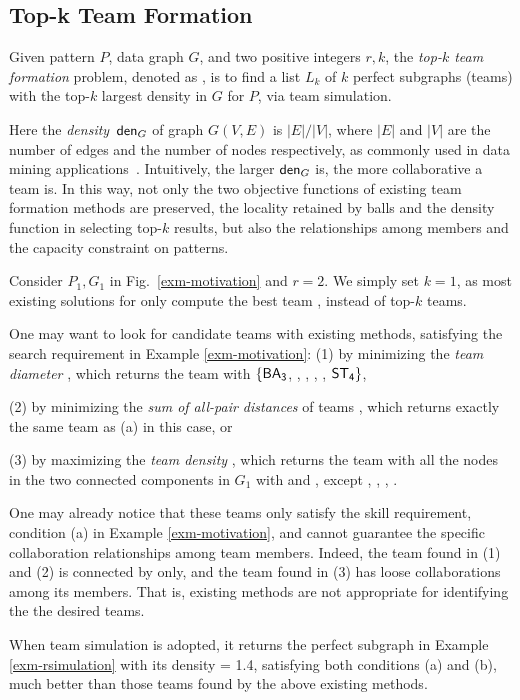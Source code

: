 
\subsection{Top-k Team Formation}
\label{subsec-teamF}

 Given pattern $P$, data graph $G$, and two positive integers $r, k$, the {\em top-$k$ team formation} problem, denoted as ,
is to find a list $L_{k}$ of $k$ perfect subgraphs (\ie teams) with the top-$k$ largest density in $G$ for $P$, via team simulation.

Here the {\em density}\, ${\mathsf{den}}_{G}$ of graph $G(V, E)$ is $|E|/|V|$, where $|E|$ and $|V|$ are the number of edges and the number of nodes respectively, as commonly used in data mining applications~\cite{maximumDenseSubgraph,EVMK12}.
Intuitively, the larger ${\mathsf{den}}_{G}$ is, the more collaborative a team is.
In this way, not only the two objective functions of existing team formation methods are preserved,
\ie the locality retained by balls and the density function in selecting top-$k$ results,
but also the relationships among members and the capacity constraint on patterns.


\begin{example}
\label{exa-teamF}
Consider $P_1, G_1$ in Fig.~\ref{exm-motivation} and $r=2$.
We simply set $k=1$, as most existing solutions for \teamF{} only compute the best team \cite{Lappas09,ArisLuca12,GajewarS12,realTeamForm13,SamikKVM12}, instead of top-$k$ teams.

One may want to look for candidate teams with existing methods, satisfying the search requirement in Example \ref{exm-motivation}:
\ni(1) by minimizing the {\em team diameter} \cite{Lappas09},
which returns the team with $\{{\mathsf{BA_3}}$, , , , , ${\mathsf{ST_4}}\}$,

\ni(2) by minimizing the {\em sum of all-pair distances} of teams \cite{Kargar11},
which returns exactly the same team as (a) in this case, or 

\ni(3) by maximizing the {\em team density} \cite{GajewarS12}, which returns the team with all the nodes in the two connected components in $G_1$ with  and , except , , , .

One may already notice that these teams only satisfy the skill requirement, \ie condition (a) in Example \ref{exm-motivation}, and cannot guarantee  the specific collaboration relationships among team members.
Indeed, the team found in (1) and (2) is connected by  only, and the team found in (3) has loose collaborations among its members.
That is, existing methods are not appropriate for identifying the the desired teams.

When team simulation is adopted, it returns the perfect subgraph in Example \ref{exm-rsimulation} with its density = 1.4,
satisfying both conditions (a) and (b), much better than those teams found by the above existing methods.
\end{example}

